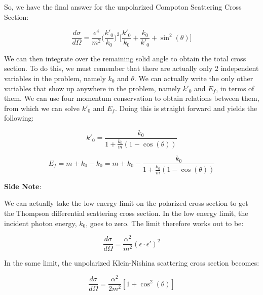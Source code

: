 \documentclass[a4]{article}
\begin{document}
    So, we have the final answer for the unpolarized Compoton Scattering Cross Section:

    \begin{framed}
        \begin{equation}
            \frac{d \sigma}{d \Omega} = \frac{e^4}{m^2} \bigg( \frac{k'_0}{k_0} \bigg)^2 \Big[ \frac{k'_0}{k_0} + \frac{k_0}{k'_0} + \sin^2 (\theta) \Big]
        \end{equation}
    \end{framed}

    We can then integrate over the remaining solid angle to obtain the total cross section. To do this, we must remember that there are actually only 2 independent variables in the problem,
    namely $k_0$ and $\theta$. We can actually write the only other variables that show up anywhere in the problem, namely $k'_0$ and $E_f$, in terms of them. We can use four momentum
    conservation to obtain relations between them, from which we can solve $k'_0$ and $E_f$. Doing this is straight forward and yields the following:

    \begin{equation}
        k'_0 = \frac{k_0}{1 + \frac{k_0}{m} (1 - \cos(\theta))}
    \end{equation}

    \begin{equation}
        E_f = m + k_0 - k_0 = m + k_0 - \frac{k_0}{1 + \frac{k_0}{m} (1 - \cos(\theta))}
    \end{equation}

    \textbf{Side Note}:

    We can actually take the low energy limit on the polarized cross section to get the Thompson differential scattering cross section. In the low energy limit, the incident photon energy, $k_0$,
    goes to zero. The limit therefore works out to be:

    \begin{framed}
        \begin{equation}
            \frac{d \sigma}{d \Omega} = \frac{\alpha^2}{m^2} (\epsilon \cdot \epsilon')^2
        \end{equation}
    \end{framed}

    In the same limit, the unpolarized Klein-Nishina scattering cross section becomes:

    \begin{framed}
        \begin{equation}
            \frac{d \sigma}{d \Omega} = \frac{\alpha^2}{2 m^2} [1 + \cos^2 (\theta)]
        \end{equation}
    \end{framed}
\end{document}
